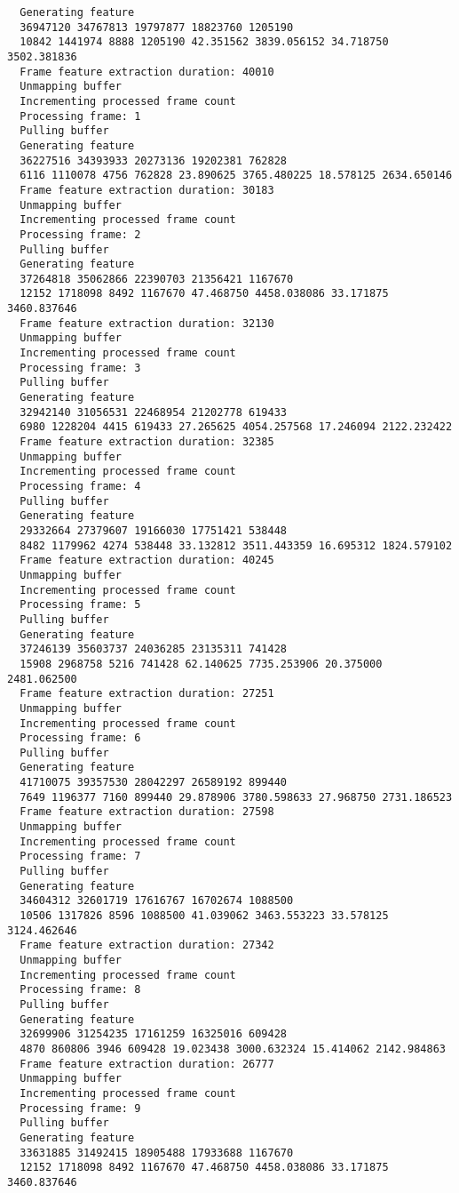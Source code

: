 \documentclass[12pt,oneside]{book}
\begin{document}
\begin{lstlisting}
  Generating feature
  36947120 34767813 19797877 18823760 1205190
  10842 1441974 8888 1205190 42.351562 3839.056152 34.718750 3502.381836
  Frame feature extraction duration: 40010
  Unmapping buffer
  Incrementing processed frame count
  Processing frame: 1
  Pulling buffer
  Generating feature
  36227516 34393933 20273136 19202381 762828
  6116 1110078 4756 762828 23.890625 3765.480225 18.578125 2634.650146
  Frame feature extraction duration: 30183
  Unmapping buffer
  Incrementing processed frame count
  Processing frame: 2
  Pulling buffer
  Generating feature
  37264818 35062866 22390703 21356421 1167670
  12152 1718098 8492 1167670 47.468750 4458.038086 33.171875 3460.837646
  Frame feature extraction duration: 32130
  Unmapping buffer
  Incrementing processed frame count
  Processing frame: 3
  Pulling buffer
  Generating feature
  32942140 31056531 22468954 21202778 619433
  6980 1228204 4415 619433 27.265625 4054.257568 17.246094 2122.232422
  Frame feature extraction duration: 32385
  Unmapping buffer
  Incrementing processed frame count
  Processing frame: 4
  Pulling buffer
  Generating feature
  29332664 27379607 19166030 17751421 538448
  8482 1179962 4274 538448 33.132812 3511.443359 16.695312 1824.579102
  Frame feature extraction duration: 40245
  Unmapping buffer
  Incrementing processed frame count
  Processing frame: 5
  Pulling buffer
  Generating feature
  37246139 35603737 24036285 23135311 741428
  15908 2968758 5216 741428 62.140625 7735.253906 20.375000 2481.062500
  Frame feature extraction duration: 27251
  Unmapping buffer
  Incrementing processed frame count
  Processing frame: 6
  Pulling buffer
  Generating feature
  41710075 39357530 28042297 26589192 899440
  7649 1196377 7160 899440 29.878906 3780.598633 27.968750 2731.186523
  Frame feature extraction duration: 27598
  Unmapping buffer
  Incrementing processed frame count
  Processing frame: 7
  Pulling buffer
  Generating feature
  34604312 32601719 17616767 16702674 1088500
  10506 1317826 8596 1088500 41.039062 3463.553223 33.578125 3124.462646
  Frame feature extraction duration: 27342
  Unmapping buffer
  Incrementing processed frame count
  Processing frame: 8
  Pulling buffer
  Generating feature
  32699906 31254235 17161259 16325016 609428
  4870 860806 3946 609428 19.023438 3000.632324 15.414062 2142.984863
  Frame feature extraction duration: 26777
  Unmapping buffer
  Incrementing processed frame count
  Processing frame: 9
  Pulling buffer
  Generating feature
  33631885 31492415 18905488 17933688 1167670
  12152 1718098 8492 1167670 47.468750 4458.038086 33.171875 3460.837646

\end{lstlisting}
\end{document}
